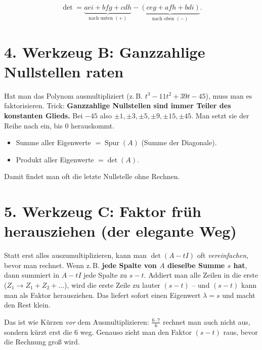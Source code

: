 \documentclass[a4paper,12pt]{article}
\begin{document}
\begin{merkbox}[title={Sarrus-Formel}]
\[
\det = \underbrace{aei + bfg + cdh}_{\text{nach unten }(+)} - \underbrace{(ceg + afh + bdi)}_{\text{nach oben }(-)}.
\]
\end{merkbox}

\section*{4. Werkzeug B: Ganzzahlige Nullstellen raten}

Hat man das Polynom ausmultipliziert (z.\,B. $t^3 - 11t^2 + 39t - 45$), muss man es faktorisieren. Trick: \textbf{Ganzzahlige Nullstellen sind immer Teiler des konstanten Glieds.} Bei $-45$ also $\pm1, \pm3, \pm5, \pm9, \pm15, \pm45$. Man setzt sie der Reihe nach ein, bis $0$ herauskommt.

\begin{merkbox}[title={Zwei kostenlose Kontrollen}]
\begin{itemize}[leftmargin=*, nosep]
    \item Summe aller Eigenwerte $= \operatorname{Spur}(A)$ (Summe der Diagonale).
    \item Produkt aller Eigenwerte $= \det(A)$.
\end{itemize}
Damit findet man oft die letzte Nullstelle ohne Rechnen.
\end{merkbox}

\section*{5. Werkzeug C: Faktor fr\"uh herausziehen (der elegante Weg)}

Statt erst alles auszumultiplizieren, kann man $\det(A - tI)$ oft \emph{vereinfachen}, bevor man rechnet. Wenn z.\,B. \textbf{jede Spalte von $A$ dieselbe Summe $s$ hat}, dann summiert in $A - tI$ jede Spalte zu $s - t$. Addiert man alle Zeilen in die erste ($Z_1 \to Z_1 + Z_2 + \dots$), wird die erste Zeile zu lauter $(s-t)$ -- und $(s-t)$ kann man als Faktor herausziehen. Das liefert sofort einen Eigenwert $\lambda = s$ und macht den Rest klein.

\begin{analogie}
Das ist wie K\"urzen \emph{vor} dem Ausmultiplizieren: $\frac{6\cdot 7}{6}$ rechnet man auch nicht aus, sondern k\"urzt erst die $6$ weg. Genauso zieht man den Faktor $(s-t)$ raus, bevor die Rechnung gro\ss{} wird.
\end{analogie}
\end{document}
